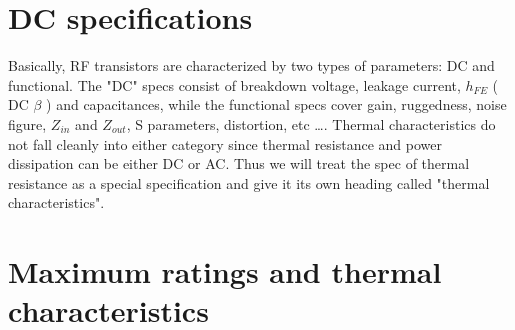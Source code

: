 \section{DC specifications}

Basically, RF transistors are characterized by two types of
parameters: DC and functional. The "DC" specs consist of breakdown
voltage, leakage current, $h_{FE}$ ( DC $\beta$ ) and capacitances,
while the functional specs cover gain, ruggedness, noise figure,
$Z_{in}$ and $Z_{out}$, S parameters, distortion, etc \ldots. Thermal
characteristics do not fall cleanly into either category since thermal
resistance and power dissipation can be either DC or AC. Thus we will
treat the spec of thermal resistance as a special specification and
give it its own heading called "thermal characteristics".

\section{Maximum ratings and thermal characteristics}
